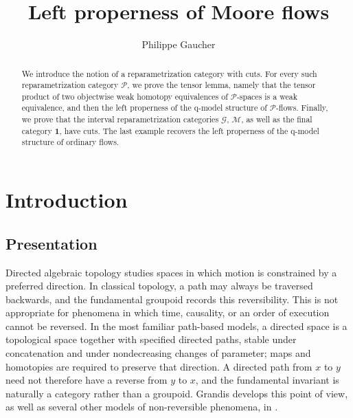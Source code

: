 \documentclass[12pt,a4paper]{amsart}
\title{Left properness of Moore flows}
\author[P. Gaucher]{Philippe Gaucher}
\newcommand{\Pcat}{\mathcal P}
\newcommand{\G}{\mathcal G}
\newcommand{\M}{\mathcal M}
\newcommand{\One}{\mathbf 1}
\theoremstyle{definition}
\begin{document}
	
	
	
\begin{abstract}
We introduce the notion of a reparametrization category with cuts. For every such reparametrization category \(\Pcat\), we prove the tensor lemma, namely that the tensor product of two objectwise weak homotopy equivalences of \(\Pcat\)-spaces is a weak equivalence, and then the left properness of the q-model structure of \(\Pcat\)-flows.  Finally, we prove that the interval reparametrization categories \(\G\), \(\M\), as well as the final category \(\One\), have cuts.  The last example recovers the left properness of the q-model structure of ordinary flows.
\end{abstract}

\maketitle
\setcounter{tocdepth}{1}
\tableofcontents
\hypersetup{linkcolor = dark-red}


\section{Introduction}

\subsection*{Presentation}
Directed algebraic topology studies spaces in which motion is constrained by a preferred direction. In classical topology, a path may always be traversed backwards, and the fundamental groupoid records this reversibility. This is not appropriate for phenomena in which time, causality, or an order of execution cannot be reversed. In the most familiar path-based models, a directed space is a topological space together with specified directed paths, stable under concatenation and under nondecreasing changes of parameter; maps and homotopies are required to preserve that direction. A directed path from \(x\) to \(y\) need not therefore have a reverse from \(y\) to \(x\), and the fundamental invariant is naturally a category rather than a groupoid. Grandis develops this point of view, as well as several other models of non-reversible phenomena, in \cite[Introduction and Part~I]{Grandis}.
\end{document}

